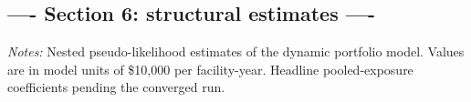 \documentclass[
  12pt,
]{article}
\begin{document}
\subsection{---- Section 6: structural estimates
----}\label{section-6-structural-estimates--}

\clearpage
\null\vfill
\begin{center}
\label{tbl-struct-estimates}
\vspace{6pt}
\par\vspace{10pt}
\begin{minipage}{0.85\textwidth}\small\textit{Notes:} Nested pseudo-likelihood estimates of the dynamic portfolio model. Values are in model units of \$10,000 per facility-year. Headline pooled-exposure coefficients pending the converged run.\end{minipage}
\end{center}
\vfill\clearpage


  
\end{document}
